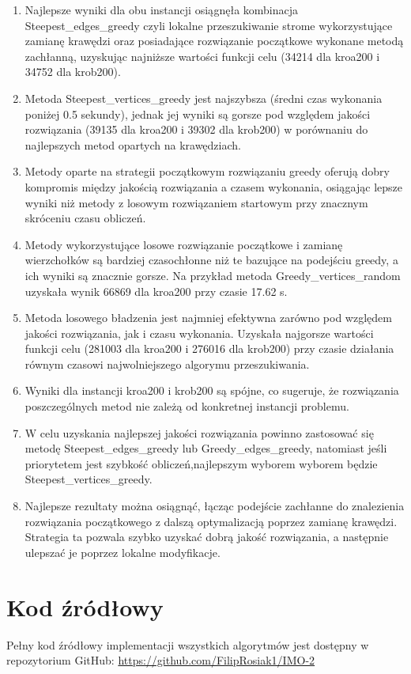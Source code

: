 \documentclass[12pt,a4paper]{article}
\begin{document}
\begin{enumerate}

\item Najlepsze wyniki dla obu instancji osiągnęła kombinacja Steepest\_edges\_greedy czyli lokalne przeszukiwanie strome wykorzystujące zamianę krawędzi oraz posiadające rozwiązanie początkowe wykonane metodą zachłanną, uzyskując najniższe wartości funkcji celu (34214 dla kroa200 i 34752 dla krob200).

\item Metoda Steepest\_vertices\_greedy jest najszybsza (średni czas wykonania poniżej 0.5 sekundy), jednak jej wyniki są gorsze pod względem jakości rozwiązania (39135 dla kroa200 i 39302 dla krob200) w porównaniu do najlepszych metod opartych na krawędziach.

\item Metody oparte na strategii początkowym rozwiązaniu greedy oferują dobry kompromis między jakością rozwiązania a czasem wykonania, osiągając lepsze wyniki niż metody z losowym rozwiązaniem startowym przy znacznym skróceniu czasu obliczeń.

\item Metody wykorzystujące losowe rozwiązanie początkowe i zamianę wierzchołków są bardziej czasochłonne niż te bazujące na podejściu greedy, a ich wyniki są znacznie gorsze. Na przykład metoda Greedy\_vertices\_random uzyskała wynik 66869 dla kroa200 przy czasie 17.62 s.

\item Metoda losowego bładzenia jest najmniej efektywna zarówno pod względem jakości rozwiązania, jak i czasu wykonania. Uzyskała najgorsze wartości funkcji celu (281003 dla kroa200 i 276016 dla krob200) przy czasie działania równym czasowi najwolniejszego algorymu przeszukiwania.

\item Wyniki dla instancji kroa200 i krob200 są spójne, co sugeruje, że rozwiązania poszczególnych metod nie zależą od konkretnej instancji problemu.

\item W celu uzyskania najlepszej jakości rozwiązania powinno zastosować się metodę Steepest\_edges\_greedy lub Greedy\_edges\_greedy, natomiast jeśli priorytetem jest szybkość obliczeń,najlepszym wyborem wyborem będzie Steepest\_vertices\_greedy.

\item Najlepsze rezultaty można osiągnąć, łącząc podejście zachłanne do znalezienia rozwiązania początkowego z dalszą optymalizacją poprzez zamianę krawędzi. Strategia ta pozwala szybko uzyskać dobrą jakość rozwiązania, a następnie ulepszać je poprzez lokalne modyfikacje.

\end{enumerate}

\section{Kod źródłowy}
Pełny kod źródłowy implementacji wszystkich algorytmów jest dostępny w repozytorium GitHub:
\url{https://github.com/FilipRosiak1/IMO-2}
\end{document}
